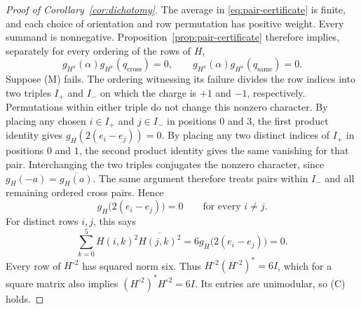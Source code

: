 \begin{proof}[Proof of Corollary~\ref{cor:dichotomy}]
The average in \eqref{eq:pair-certificate} is finite, and each choice
of orientation and row permutation has positive weight.  Every
summand is nonnegative.  Proposition~\ref{prop:pair-certificate}
therefore implies, separately for every ordering of the rows of $H$,
\begin{equation*}
  g_{H^\pi}(\alpha)g_{H^\pi}(q_{\mathrm{cross}})=0,
  \qquad
  g_{H^\pi}(\alpha)g_{H^\pi}(q_{\mathrm{same}})=0.
\end{equation*}
Suppose (M) fails.  The ordering witnessing its failure divides the
row indices into two triples $I_+$ and $I_-$ on which the charge is
$+1$ and $-1$, respectively.  Permutations within either triple do
not change this nonzero character.  By placing any chosen
$i\in I_+$ and $j\in I_-$ in positions $0$ and $3$, the first product
identity gives
$g_H(2(e_i-e_j))=0$.  By placing any two distinct indices of $I_+$ in
positions $0$ and $1$, the second product identity gives the same
vanishing for that pair.  Interchanging the two triples conjugates
the nonzero character, since $g_H(-a)=\overline{g_H(a)}$.
The same argument therefore treats pairs within $I_-$ and all
remaining ordered cross pairs.  Hence
\begin{equation*}
  g_H\bigl(2(e_i-e_j)\bigr)=0
  \qquad\text{for every }i\ne j.
\end{equation*}
For distinct rows $i,j$, this says
\begin{equation*}
  \sum_{k=0}^5 H(i,k)^2\overline{H(j,k)^2}
      =6g_H\bigl(2(e_i-e_j)\bigr)=0.
\end{equation*}
Every row of $H^{\circ2}$ has squared norm six.  Thus
$H^{\circ2}(H^{\circ2})^*=6I$, which for a square matrix also implies
$(H^{\circ2})^*H^{\circ2}=6I$.  Its entries are unimodular, so (C)
holds.
\end{proof}
